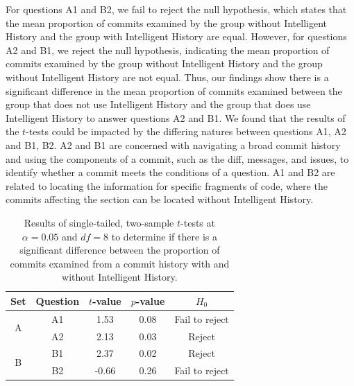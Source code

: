 For questions A1 and B2, we fail to reject the null hypothesis, which states that the mean proportion of commits examined 
by the group without Intelligent History and the group with Intelligent History are equal.
However, for questions A2 and B1, we reject the null hypothesis, indicating the mean proportion of commits examined 
by the group without Intelligent History and the group without Intelligent History are not equal.
Thus, our findings show there is a significant difference in the mean proportion of commits examined between 
the group that does not use Intelligent History and the group that does use Intelligent History to answer questions A2 and B1.
We found that the results of the $t$-tests could be impacted by the differing natures between questions A1, A2 and B1, B2.
A2 and B1 are concerned with navigating a broad commit history and using the components of a commit, such
as the diff, messages, and issues, to identify whether a commit meets the conditions of a question.
A1 and B2 are related to locating the information for specific fragments of code,
where the commits affecting the section can be located without Intelligent History. 

\begin{table}[h]
  \caption{
    Results of single-tailed, two-sample $t$-tests at $\alpha = 0.05$ and $df = 8$ to determine if there is a significant difference between the proportion of commits examined from a commit history
    with and without Intelligent History.
  }
  \centering
  \begin{tabular}{@{}ccccc@{}}
    \toprule
    Set                                     & Question               & \multicolumn{1}{c}{$t$-value} & \multicolumn{1}{c}{$p$-value} & $H_{0}$ \\ \midrule
    \multicolumn{1}{c|}{\multirow{2}{*}{A}} & \multicolumn{1}{c|}{A1} & 1.53                        & 0.08                        & Fail to reject   \\ \cmidrule(l){2-5} 
    \multicolumn{1}{c|}{}                   & \multicolumn{1}{c|}{A2} & 2.13                        & 0.03                        & Reject   \\ \midrule
    \multicolumn{1}{c|}{\multirow{2}{*}{B}} & \multicolumn{1}{c|}{B1} & 2.37                        & 0.02                        & Reject   \\ \cmidrule(l){2-5} 
    \multicolumn{1}{c|}{}                   & \multicolumn{1}{c|}{B2} & -0.66                       & 0.26                        & Fail to reject   \\ \bottomrule
  \end{tabular}
  \label{tab:t-test}
\end{table}

